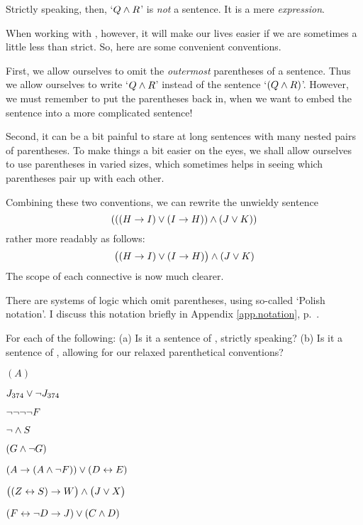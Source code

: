 Strictly speaking, then, `$Q \wedge R$' is \emph{not} a sentence. It is a mere \emph{expression}.

When working with \TFL, however, it will make our lives easier if we are sometimes a little less than strict. So, here are some convenient conventions.

First,  we allow ourselves to omit the \emph{outermost} parentheses of a sentence. Thus we allow ourselves to write `$Q \wedge R$' instead of the sentence `$(Q \wedge R)$'. However, we must remember to put the parentheses back in, when we want to embed the sentence into a more complicated sentence!

Second, it can be a bit painful to stare at long sentences with many nested pairs of parentheses. To make things a bit easier on the eyes, we shall allow ourselves to use parentheses in varied sizes, which sometimes helps in seeing which parentheses pair up with each other.


Combining these two conventions, we can rewrite the unwieldy sentence
$$(((H \rightarrow I) \vee (I \rightarrow H)) \wedge (J \vee K))$$
rather more readably as follows:
$$\bigl( (H \rightarrow I) \vee (I \rightarrow H) \bigr) \wedge (J \vee K)$$
The scope of each connective is now much clearer.

There are systems of logic which omit parentheses, using so-called `Polish notation'. I discuss this notation briefly in Appendix \ref{app.notation}, p.~\pageref{polish}. 


\practiceproblems

\problempart
\label{pr.wiffTFL}
For each of the following: (a) Is it a sentence of \TFL, strictly speaking? (b) Is it a sentence of \TFL, allowing for our relaxed parenthetical conventions?
\begin{earg}
\item $(A)$
\item $J_{374} \vee \neg J_{374}$
\item $\neg \neg \neg \neg F$
\item $\neg \wedge S$
\item $(G \wedge \neg G)$
\item $(A \rightarrow (A \wedge \neg F)) \vee (D \leftrightarrow E)$
\item $\bigl( (Z \leftrightarrow S) \rightarrow W \bigr) \wedge \bigl(J \vee X\bigr)$
\item $(F \leftrightarrow \neg D \rightarrow J) \vee (C \wedge D)$
\end{earg}


